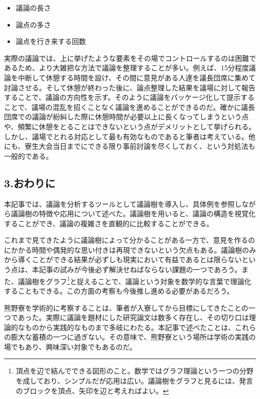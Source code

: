 \begin{itemize}
  \item 議論の長さ
  \item 論点の多さ
  \item 論点を行き来する回数
\end{itemize}
\par
実際の議論では、上に挙げたような要素をその場でコントロールするのは困難であるため、より大雑把な方法で議論を整理することが多い。例えば、15分程度議論を中断して休憩する時間を設け、その間に意見がある人達を議長団席に集めて討論させる。そして休憩が終わった後に、論点整理した結果を議場に対して報告することで、議論の方向性を示す。そのように議論をパッケージ化して提示することで、議場の混乱を招くことなく議論を進めることができるのだ。確かに議長団席での議論が紛糾した際に休憩時間が必要以上に長くなってしまうという点や、頻繁に休憩をとることはできないという点がデメリットとして挙げられる。しかし、議場でとれる対応として最も有効なものであると筆者は考えている。他にも、寮生大会当日までにできる限り事前討論を尽くしておく、という対処法も一般的である。
\subsection{3.おわりに}
本記事では、議論を分析するツールとして議論樹を導入し、具体例を参照しながら議論樹の特徴や応用について述べた。議論樹を用いると、議論の構造を視覚化することができ、議論の複雑さを直観的に比較することができる。
\par
これまで見てきたように議論樹によって分かることがある一方で、意見を作るのにかかる時間や偶発的な思い付きは再現できないという欠点もある。議論樹のみから導くことができる結果が必ずしも現実において有益であるとは限らないという点は、本記事の試みが今後必ず解決せねばならない課題の一つであろう。また、議論樹をグラフ\footnote{頂点を辺で結んでできる図形のこと。数学ではグラフ理論という一つの分野を成しており、シンプルだが応用は広い。議論樹をグラフと見るには、発言のブロックを頂点、矢印を辺と考えればよい。}と捉えることで、議論という対象を数学的な言葉で理論化することもできる。この方面の考察も今後推し進める必要があるだろう。
\par
熊野寮を学術的に考察することは、筆者が入寮してから目標にしてきたことの一つであった。実際に議論を題材にした研究論文は数多く存在し、その切り口は理論的なものから実践的なものまで多岐にわたる。本記事で述べたことは、これらの膨大な蓄積の一つに過ぎない。その意味で、熊野寮という場所は学術の実践の場でもあり、興味深い対象でもあるのだ。